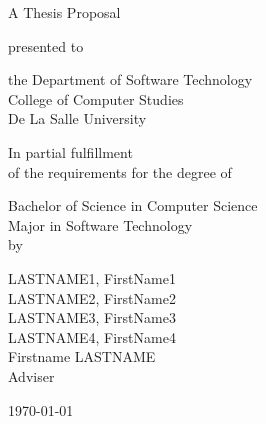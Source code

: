 %
%
%                 

\begin{titlepage}
\centering



\vspace{1.5cm}

A Thesis Proposal\\

\vspace{0.5cm}

presented to\\

\vspace{0.5cm}

the Department of Software Technology\\
College of Computer Studies\\
De La Salle University

\vspace{1cm}

In partial fulfillment\\
of the requirements for the degree of\\

\vspace{0.5cm}

Bachelor of Science in Computer Science\\
Major in Software Technology
\vspace{1.75cm}
\\by\\


\vspace{1cm}

LASTNAME1, FirstName1  \\
LASTNAME2, FirstName2  \\
LASTNAME3, FirstName3  \\
LASTNAME4, FirstName4  \\

\vspace{1.75cm}
Firstname LASTNAME \\
Adviser

\vspace{1.75cm}
\today
\end{titlepage}
